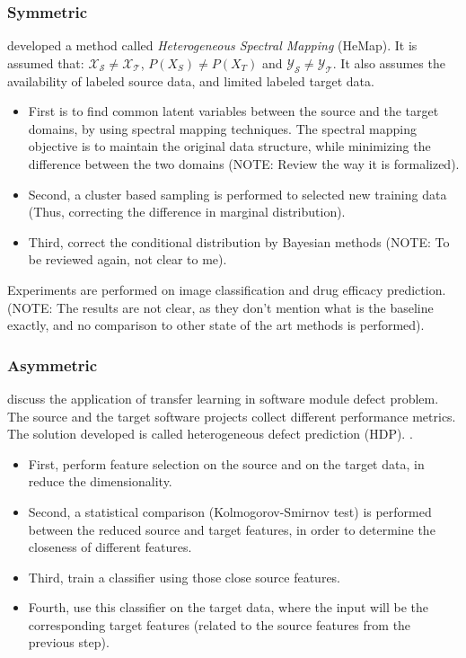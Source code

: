   \subsubsection{Symmetric}
  \citep{shi2010transfer} developed a method called \emph{Heterogeneous Spectral Mapping} (HeMap). It is assumed that: $\mathcal{X_S} \neq \mathcal{X_T}$, $P(X_S) \neq P(X_T)$ and $\mathcal{Y_S} \neq \mathcal{Y_T}$. It also assumes the availability of labeled source data, and limited labeled target data.
  \begin{itemize}
      \item First is to find common latent variables between the source and the target domains, by using spectral mapping techniques. The spectral mapping objective is to maintain the original data structure, while minimizing the difference between the two domains (NOTE: Review the way it is formalized).
      \item Second, a cluster based sampling is performed to selected new training data (Thus, correcting the difference in marginal distribution).
      \item Third, correct the conditional distribution by Bayesian methods (NOTE: To be reviewed again, not clear to me).
  \end{itemize}
  Experiments are performed on image classification and drug efficacy prediction. (NOTE: The results are not clear, as they don't mention what is the baseline exactly, and no comparison to other state of the art methods is performed).

  \subsubsection{Asymmetric}
  \citep{Nam:2015:HDP:2786805.2786814} discuss the application of transfer learning in software module defect problem. The source and the target software projects collect different performance metrics. The solution developed is called heterogeneous defect prediction (HDP). .
  \begin{itemize}
      \item First, perform feature selection on the source and on the target data, in reduce the dimensionality.
      \item Second, a statistical comparison (Kolmogorov-Smirnov test) is performed between the reduced source and target features, in order to determine the closeness of different features.
      \item Third, train a classifier using those close source features.
      \item Fourth, use this classifier on the target data, where the input will be the corresponding target features (related to the source features from the previous step).
  \end{itemize}

